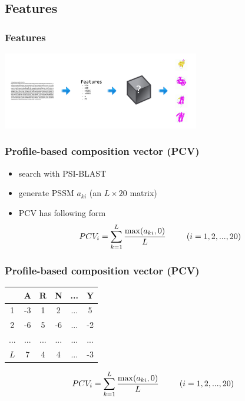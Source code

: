 \documentclass{beamer}
\begin{document}
\subsection{Features}
\begin{frame}
  \frametitle{Features}
  \begin{center}
    \includegraphics[width=325px]{classification.jpg}
  \end{center}
\end{frame}
\begin{frame}
  \frametitle{Profile-based composition vector (PCV)}
  \begin{itemize}
    \item search with PSI-BLAST
    \item generate PSSM $a_{ki}$ (an $L \times 20$ matrix)
    \item PCV has following form \[ PCV_i = \sum_{k=1}^{L}\frac{\max(a_{ki}, 0)}{L} \hspace{25px} (i=1,2,...,20) \]
  \end{itemize}
\end{frame}
\begin{frame}
  \frametitle{Profile-based composition vector (PCV)}
  \begin{table} \centering
  \begin{tabular}{ c | c c c c c } 
        & A & R & N & ... & Y \\ \hline
    1   & -3 & 1 & 2 & ... & 5 \\
    2   & -6 & 5 & -6 & ... & -2 \\
    ... & ... & ... & ... & ... & ... \\
    $L$ & 7 & 4 & 4 & ... & -3 \\
  \end{tabular}
  
  \vspace{25px}
  
  \[ PCV_i = \sum_{k=1}^{L}\frac{\max(a_{ki}, 0)}{L} \hspace{25px} (i=1,2,...,20) \]
  \vspace{5px}
\end{table}
\end{frame}
\end{document}
